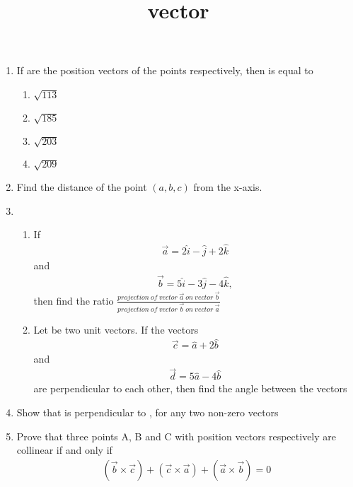 \documentclass{article}
\title{vector}
\begin{document}
\begin{enumerate}
	\item If  are the position vectors of the points  respectively, then  is equal to
\begin{enumerate}[label=(\Alph*)]
\item $\sqrt{113}$
\item $\sqrt{185}$
\item $\sqrt{203}$
\item $\sqrt{209}$
\end{enumerate}
\item Find the distance of the point $(a, b, c)$ from the x-axis.
\item \begin{enumerate} %
		\item If 
			\begin{align}
				\vec{a}= 2\hat{i} - \hat{j} + 2\hat{k}
			\end{align}
			and
			\begin{align}
				\vec{b} = 5\hat{i} - 3\hat{j} - 4\hat{k},
			\end{align}
			then find the ratio
		$\frac{projection\:of\:vector\:\vec{a}\:on\:vector \:\vec{b}}{projection\:of\:vector\:\vec{b}\:on\:vector\:\vec{a}}$
\item Let  be two unit vectors. If the vectors 
	\begin{align}
		\vec{c} = \hat{a} + 2\hat{b}
	\end{align}
		and 
		\begin{align}
			\vec{d} = 5\hat{a} - 4\hat{b} 
		\end{align}
		are perpendicular to each other, then find the angle between the vectors  
\end{enumerate}
\item Show that  is perpendicular to , for any two non-zero vectors 
\item Prove that three points A, B and C with position vectors  respectively are collinear if and only if 
	\begin{align}
		(\vec{b} \times \vec{c}) + (\vec{c} \times \vec{a}) + (\vec{a} \times \vec{b}) = 0
	\end{align}
\end{enumerate}
\end{document}
